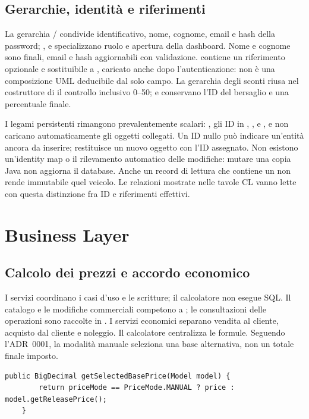 \subsection{Gerarchie, identità e riferimenti}
La gerarchia / condivide identificativo,
nome, cognome, email e hash della password; , 
e  specializzano ruolo e apertura della dashboard.
Nome e cognome sono finali, email e hash aggiornabili con validazione.
 contiene un riferimento opzionale e sostituibile a
, caricato anche dopo l'autenticazione: non è una
composizione UML deducibile dal solo campo. La gerarchia degli sconti
riusa nel costruttore di  il controllo inclusivo 0--50;
 e  conservano l'ID del bersaglio
e una percentuale finale.

I legami persistenti rimangono prevalentemente scalari:
, gli ID in , ,
 e , e  non
caricano automaticamente gli oggetti collegati. Un ID nullo può indicare
un'entità ancora da inserire;  restituisce un nuovo oggetto con
l'ID assegnato. Non esistono un'identity map o il rilevamento automatico
delle modifiche: mutare una copia Java non aggiorna il database. Anche
un record di lettura che contiene un  non rende immutabile
quel veicolo. Le relazioni mostrate nelle tavole CL vanno lette con questa
distinzione fra ID e riferimenti effettivi.

\section{Business Layer}\label{sec:impl-business}
\subsection{Calcolo dei prezzi e accordo economico}
I servizi coordinano i casi d'uso e le scritture; il calcolatore non esegue
SQL. Il catalogo e le modifiche commerciali competono a
; le consultazioni delle operazioni sono raccolte
in . I servizi economici separano vendita
al cliente, acquisto dal cliente e noleggio. Il calcolatore
 centralizza le formule.
Seguendo l'ADR~0001, la modalità manuale seleziona una base alternativa,
non un totale finale imposto.

\noindent\begin{minipage}{\linewidth}
\begin{lstlisting}[firstnumber=122,caption={\code{Vehicle.java}: selezione della base, prima della formula.},
  label=lst:base]
    public BigDecimal getSelectedBasePrice(Model model) {
        return priceMode == PriceMode.MANUAL ? price : model.getReleasePrice();
    }
\end{lstlisting}
\end{minipage}


